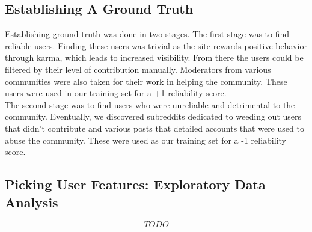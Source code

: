 \subsection{Establishing A Ground Truth} %
\label{sub:establishing_a_ground_truth}
Establishing ground truth was done in two stages. The first stage was to find
reliable users. Finding these users was trivial as the site rewards positive behavior
through karma, which leads to increased visibility. From there the users could
be filtered by their level of contribution manually. Moderators from various
communities were also taken for their work in helping the community. These users
were used in our training set for a +1 reliability score. \\
The second stage was to find users who were unreliable and detrimental to the community.
Eventually, we discovered subreddits dedicated to weeding out users that didn't
contribute and various posts that detailed accounts that were used to abuse the
community. These were used as our training set for a -1 reliability score.


\subsection{Picking User Features: Exploratory Data Analysis} %
\label{sub:picking_user_features}

\[ TODO \]



